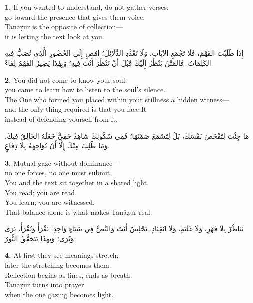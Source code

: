 \documentclass[11pt,a4paper,twoside]{book}
\begin{document}
{\color{indigo}\bfseries 1.}\quad
If you wanted to understand, do not gather verses;\\
go toward the presence that gives them voice.\\
Tanāẓur is the opposite of collection—\\
it is letting the text look at you.

\begin{flushright}
{\arabicfont
إِذَا طَلَبْتَ الفَهْمَ، فَلَا تَجْمَعِ الآيَاتِ، وَلَا تَعْدَّدِ الدَّلَائِلَ؛
امْضِ إِلَى الحُضُورِ الَّذِي تُصَبُّ فِيهِ الكَلِمَاتُ.
فَالمَتْنُ يَنْظُرُ إِلَيْكَ قَبْلَ أَنْ تَنْظُرَ أَنْتَ فِيهِ؛
وَبِهٰذَا يَصِيرُ الفَهْمُ لِقَاءً.}
\end{flushright}

\vspace{1em}
{\color{indigo}\bfseries 2.}\quad
You did not come to know your soul;\\
you came to learn how to listen to the soul's silence.\\
The One who formed you placed within your stillness a hidden witness—\\
and the only thing required is that you face It\\
instead of defending yourself from it.

\begin{flushright}
{\arabicfont
مَا جِئْتَ لِتَفْحَصَ نَفْسَكَ، بَلْ لِتَسْمَعَ صَمْتَهَا؛
فَفِي سُكُونِكَ شَاهِدٌ خَفِيٌّ جَعَلَهُ الخَالِقُ فِيكَ.
وَمَا طُلِبَ مِنْكَ إِلَّا أَنْ تُوَاجِهَهُ بِلَا دِفَاعٍ.}
\end{flushright}

\vspace{1em}
{\color{indigo}\bfseries 3.}\quad
Mutual gaze without dominance—\\
no one forces, no one must submit.\\
You and the text sit together in a shared light.\\
You read; you are read.\\
You learn; you are witnessed.\\
That balance alone is what makes Tanāẓur real.

\begin{flushright}
{\arabicfont
تَنَاظُرٌ بِلَا قَهْرٍ، وَلَا غَلَبَةٍ، وَلَا انْقِيَادٍ.
تَجْلِسُ أَنْتَ وَالنَّصُّ فِي سَنَاءٍ وَاحِدٍ.
تَقْرَأُ وَتُقْرَأُ، تَرَى وَتُرَى؛
وَبِهٰذَا يَتَحَقَّقُ النُّورُ.}
\end{flushright}

\vspace{1em}
{\color{indigo}\bfseries 4.}\quad
At first they see meanings stretch;\\
later the stretching becomes them.\\
Reflection begins as lines, ends as breath.\\
Tanāẓur turns into prayer\\
when the one gazing becomes light.
\end{document}
